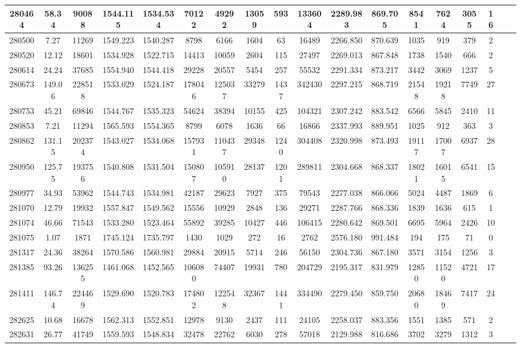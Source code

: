 \documentclass[10pt]{extarticle}
\begin{document}
\begin{longtable}{|c|c|c|c|c|c|c|c|c|c|c|c|c|c|c|c|c|c|}
\hline 
280464&58.34&90088&1544.115&1534.534&70122&49292&13059&593&133604&2289.983&869.705&8541&7624&3055&16 \\ 
\hline 
280500&7.27&11269&1549.223&1540.287&8798&6166&1604&63&16489&2266.850&870.639&1035&919&379&2 \\ 
\hline 
280520&12.12&18601&1534.928&1522.715&14413&10059&2604&115&27497&2269.013&867.848&1738&1540&666&2 \\ 
\hline 
280614&24.24&37685&1554.940&1544.418&29228&20557&5454&257&55532&2291.334&873.217&3442&3069&1237&5 \\ 
\hline 
280673&149.06&228518&1533.029&1524.187&178046&125037&33279&1437&342430&2297.215&868.719&21548&19218&7749&27 \\ 
\hline 
280753&45.21&69846&1544.767&1535.323&54624&38394&10155&425&104321&2307.242&883.542&6566&5845&2410&11 \\ 
\hline 
280853&7.21&11294&1565.593&1554.365&8799&6078&1636&66&16866&2337.993&889.951&1025&912&363&3 \\ 
\hline 
280862&131.15&202374&1543.027&1534.068&157931&110437&29348&1240&304408&2320.998&873.493&19117&17007&6937&28 \\ 
\hline 
280950&125.75&193756&1540.808&1531.504&150807&105910&28137&1201&289811&2304.668&868.337&18021&16015&6541&15 \\ 
\hline 
280977&34.93&53962&1544.743&1534.981&42187&29623&7927&375&79543&2277.038&866.066&5024&4487&1869&6 \\ 
\hline 
281070&12.79&19932&1557.847&1549.562&15556&10929&2848&136&29271&2287.766&868.336&1839&1636&615&1 \\ 
\hline 
281074&46.66&71543&1533.280&1523.464&55892&39285&10427&446&106415&2280.642&869.501&6695&5964&2426&10 \\ 
\hline 
281075&1.07&1871&1745.124&1735.797&1430&1029&272&16&2762&2576.180&991.484&194&175&71&0 \\ 
\hline 
281317&24.36&38264&1570.586&1560.981&29884&20915&5714&246&56150&2304.736&867.180&3571&3154&1256&3 \\ 
\hline 
281385&93.26&136255&1461.068&1452.565&106080&74407&19931&780&204729&2195.317&831.979&12850&11520&4721&17 \\ 
\hline 
281411&146.74&224469&1529.690&1520.783&174802&122548&32367&1441&334490&2279.450&859.750&20680&18469&7417&24 \\ 
\hline 
282625&10.68&16678&1562.313&1552.851&12978&9130&2437&111&24105&2258.037&883.356&1551&1385&571&2 \\ 
\hline 
282631&26.77&41749&1559.593&1548.834&32478&22762&6030&278&57018&2129.988&816.686&3702&3279&1312&3 \\ 

\end{longtable}
\end{document}
